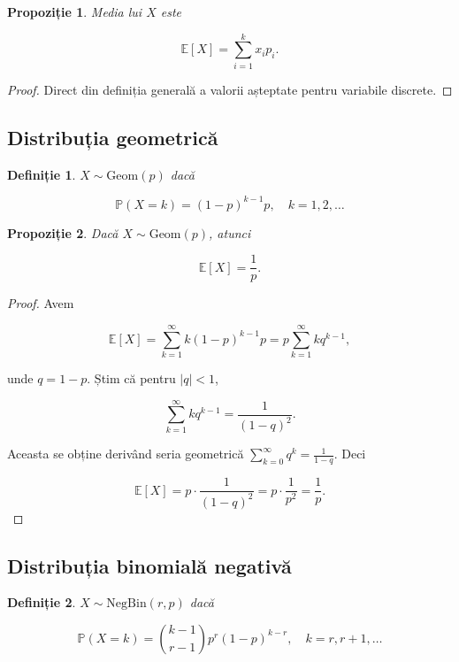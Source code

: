 \documentclass[12pt]{article}
\theoremstyle{plain}
\newtheorem{definition}{Definiție}
\newtheorem{proposition}{Propoziție}
\begin{document}
\begin{proposition}
Media lui $X$ este


\[
\mathbb{E}[X] = \sum_{i=1}^k x_i p_i.
\]


\end{proposition}

\begin{proof}
Direct din definiția generală a valorii așteptate pentru variabile discrete.
\end{proof}

\subsection{Distribuția geometrică}

\begin{definition}
$X \sim \mathrm{Geom}(p)$ dacă


\[
\mathbb{P}(X = k) = (1-p)^{k-1} p,\quad k=1,2,\dots
\]


\end{definition}

\begin{proposition}
Dacă $X \sim \mathrm{Geom}(p)$, atunci


\[
\mathbb{E}[X] = \frac{1}{p}.
\]


\end{proposition}

\begin{proof}
Avem


\[
\mathbb{E}[X] = \sum_{k=1}^{\infty} k (1-p)^{k-1} p = p \sum_{k=1}^{\infty} k q^{k-1},
\]


unde $q = 1-p$.
Știm că pentru $|q|<1$,


\[
\sum_{k=1}^{\infty} k q^{k-1} = \frac{1}{(1-q)^2}.
\]


Aceasta se obține derivând seria geometrică $\sum_{k=0}^{\infty} q^k = \frac{1}{1-q}$.
Deci


\[
\mathbb{E}[X] = p \cdot \frac{1}{(1-q)^2} = p \cdot \frac{1}{p^2} = \frac{1}{p}.
\]


\end{proof}

\subsection{Distribuția binomială negativă}

\begin{definition}
$X \sim \mathrm{NegBin}(r,p)$ dacă


\[
\mathbb{P}(X = k) = \binom{k-1}{r-1} p^r (1-p)^{k-r},\quad k=r,r+1,\dots
\]


\end{definition}
\end{document}
